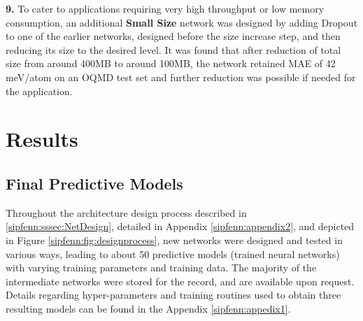 \textbf{9. }To cater to applications requiring very high throughput or low memory consumption, an additional \textbf{Small Size} network was designed by adding Dropout to one of the earlier networks, designed before the size increase step, and then reducing its size to the desired level. It was found that after reduction of total size from around 400MB to around 100MB, the network retained MAE of 42 meV/atom on an OQMD test set and further reduction was possible if needed for the application.

\section{Results} \label{sipfenn:sec:Results}

\subsection{Final Predictive Models} \label{sipfenn:sssec:DesignedModels}

Throughout the architecture design process described in \ref{sipfenn:sssec:NetDesign}, detailed in Appendix \ref{sipfenn:appendix2}, and depicted in Figure \ref{sipfenn:fig:designprocess}, new networks were designed and tested in various ways, leading to about 50 predictive models (trained neural networks) with varying training parameters and training data. The majority of the intermediate networks were stored for the record, and are available upon request. Details regarding hyper-parameters and training routines used to obtain three resulting models can be found in the Appendix \ref{sipfenn:appedix1}.

